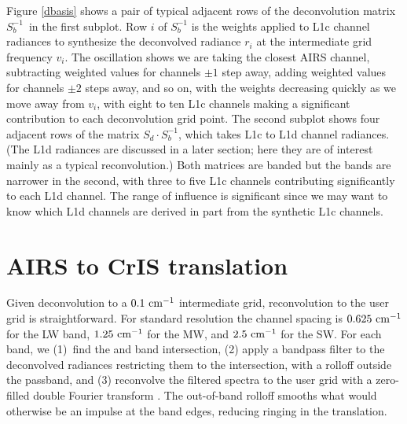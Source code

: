 \documentclass[10pt,twocolumn]{article}
\begin{document}


Figure \ref{dbasis} shows a pair of typical adjacent rows of the
deconvolution matrix $S_b^{-1}$\, in the first subplot.  Row $i$ of
$S_b^{-1}$ is the weights applied to L1c channel radiances to
synthesize the deconvolved radiance $r_i$ at the intermediate grid
frequency $v_i$.  The oscillation shows we are taking the closest
AIRS channel, subtracting weighted values for channels $\pm 1$ step
away, adding weighted values for channels $\pm 2$ steps away, and so
on, with the weights decreasing quickly as we move away from $v_i$,
with eight to ten L1c channels making a significant contribution to
each deconvolution grid point.  The second subplot shows four
adjacent rows of the matrix $S_d \cdot S_b^{-1}$, which takes L1c to
L1d channel radiances.  (The L1d radiances are discussed in a later
section; here they are of interest mainly as a typical
reconvolution.)  Both matrices are banded but the bands are narrower
in the second, with three to five L1c channels contributing
significantly to each L1d channel.  The range of influence is
significant since we may want to know which L1d channels are derived
in part from the synthetic L1c channels.

\section{AIRS to CrIS translation}
\label{airs2cris}

Given {\airs} deconvolution to a $0.1~\mbox{cm$^{-1}$}$ intermediate grid,
reconvolution to the {\cris} user grid is straightforward.  For
{\cris} standard resolution the channel spacing is $0.625~\mbox{cm$^{-1}$}$ 
for the LW band, $1.25~\mbox{cm$^{-1}$}$ for the MW, and $2.5~\mbox{cm$^{-1}$}$ for the SW.
For each {\cris} band, we (1)~find the {\airs} and {\cris} band
intersection, (2) apply a bandpass filter to the deconvolved {\airs}
radiances restricting them to the intersection, with a rolloff
outside the passband, and (3) reconvolve the filtered spectra to 
the {\cris} user grid with a zero-filled double Fourier transform
\cite{git:finterp}.  The out-of-band rolloff smooths what would
otherwise be an impulse at the band edges, reducing ringing in the
translation.  
\end{document}
